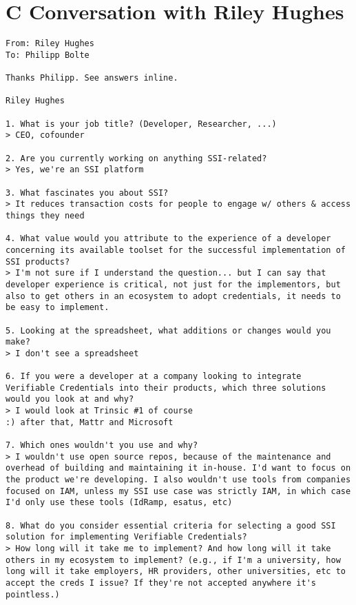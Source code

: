 \section*{C Conversation with Riley Hughes}\label{appendix: hughes}
\begin{Verbatim}[breaklines=true, breaksymbol={}, breaksymbolsepleftnchars=2]
From: Riley Hughes
To: Philipp Bolte

Thanks Philipp. See answers inline.

Riley Hughes

1. What is your job title? (Developer, Researcher, ...)
> CEO, cofounder

2. Are you currently working on anything SSI-related?
> Yes, we're an SSI platform

3. What fascinates you about SSI?
> It reduces transaction costs for people to engage w/ others & access things they need

4. What value would you attribute to the experience of a developer concerning its available toolset for the successful implementation of SSI products? 
> I'm not sure if I understand the question... but I can say that developer experience is critical, not just for the implementors, but also to get others in an ecosystem to adopt credentials, it needs to be easy to implement.

5. Looking at the spreadsheet, what additions or changes would you make?
> I don't see a spreadsheet

6. If you were a developer at a company looking to integrate Verifiable Credentials into their products, which three solutions would you look at and why?
> I would look at Trinsic #1 of course 
:) after that, Mattr and Microsoft

7. Which ones wouldn't you use and why?
> I wouldn't use open source repos, because of the maintenance and overhead of building and maintaining it in-house. I'd want to focus on the product we're developing. I also wouldn't use tools from companies focused on IAM, unless my SSI use case was strictly IAM, in which case I'd only use these tools (IdRamp, esatus, etc)

8. What do you consider essential criteria for selecting a good SSI solution for implementing Verifiable Credentials? 
> How long will it take me to implement? And how long will it take others in my ecosystem to implement? (e.g., if I'm a university, how long will it take employers, HR providers, other universities, etc to accept the creds I issue? If they're not accepted anywhere it's pointless.)


\end{Verbatim}
